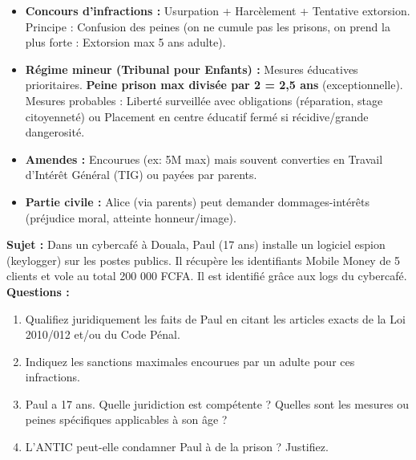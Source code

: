 \documentclass[11pt]{article}
\newcommand{\cle}[1]{{\popxbold\color{popdark}#1}}
\begin{document}
\begin{exoresolu}
\begin{enumerate}
              \begin{itemize}
                  \item \textbf{Concours d'infractions :} Usurpation + Harcèlement + Tentative extorsion. Principe : \cle{Confusion des peines} (on ne cumule pas les prisons, on prend la plus forte : Extorsion max 5 ans adulte).
                  \item \textbf{Régime mineur (Tribunal pour Enfants) :} Mesures éducatives prioritaires. \textbf{Peine prison max divisée par 2 = 2,5 ans} (exceptionnelle). Mesures probables : Liberté surveillée avec obligations (réparation, stage citoyenneté) ou Placement en centre éducatif fermé si récidive/grande dangerosité.
                  \item \textbf{Amendes :} Encourues (ex: 5M max) mais souvent converties en Travail d'Intérêt Général (TIG) ou payées par parents.
                  \item \textbf{Partie civile :} Alice (via parents) peut demander dommages-intérêts (préjudice moral, atteinte honneur/image).
              \end{itemize}
    \end{enumerate}
\end{exoresolu}

\begin{exercice}
    \textbf{Sujet :} Dans un cybercafé à Douala, Paul (17 ans) installe un logiciel espion (keylogger) sur les postes publics. Il récupère les identifiants Mobile Money de 5 clients et vole au total 200 000 FCFA. Il est identifié grâce aux logs du cybercafé.
    \textbf{Questions :}
    \begin{enumerate}
        \item Qualifiez juridiquement les faits de Paul en citant les articles exacts de la Loi 2010/012 et/ou du Code Pénal.
        \item Indiquez les sanctions maximales encourues par un adulte pour ces infractions.
        \item Paul a 17 ans. Quelle juridiction est compétente ? Quelles sont les mesures ou peines spécifiques applicables à son âge ?
        \item L'ANTIC peut-elle condamner Paul à de la prison ? Justifiez.
    \end{enumerate}
\end{exercice}
\end{document}
